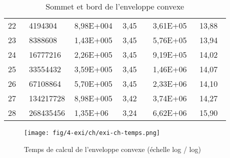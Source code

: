 \begin{table}[H]
\begin{tabular}{|p{0.09\linewidth}|p{0.13\linewidth}||p{0.2\linewidth}|p{0.13\linewidth}||p{0.2\linewidth}|p{0.13\linewidth}|}
    22 & 4194304   & 8,98E+004 & 3,45 & 3,61E+05 &  13,88\\
    23 & 8388608   & 1,43E+005 & 3,45 & 5,76E+05 &  13,94\\
    24 & 16777216  & 2,26E+005 & 3,45 & 9,19E+05 &  14,02\\
    25 & 33554432  & 3,59E+005 & 3,45 & 1,46E+06 &  14,07\\
    26 & 67108864  & 5,70E+005 & 3,45 & 2,33E+06 &  14,10\\
    27 & 134217728 & 8,98E+005 & 3,42 & 3,74E+06 &  14,27\\
    28 & 268435456 & 1,35E+06  & 3,24 & 6,62E+06 &  15,90\\
    \hline
  \end{tabular} 
  \caption{Sommet et bord de l'enveloppe convexe}
\end{table}

\begin{figure}[H]
  \centering
  \texttt{[image: fig/4-exi/ch/exi-ch-temps.png]}
  \caption{Temps de calcul de l'enveloppe convexe (échelle log / log)}
\end{figure}

